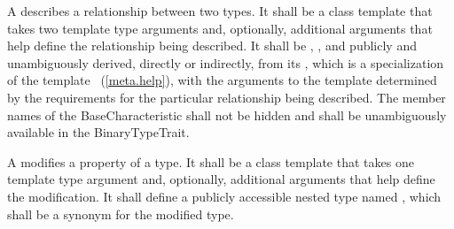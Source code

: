 \pnum
A  describes a
relationship between two types. It shall be a class template that
takes two template type arguments and, optionally, additional
arguments that help define the relationship being described. It shall
be , ,
and publicly and unambiguously derived, directly or
indirectly, from
its , which is a specialization
of the template
~(\ref{meta.help}), with
the arguments to the template  determined by the
requirements for the particular relationship being described.
The member names of the BaseCharacteristic shall not be hidden and shall be
unambiguously available in the BinaryTypeTrait.

\pnum
A 
modifies a property
of a type. It shall be a class template that takes one
template type argument and, optionally, additional arguments that help
define the modification. It shall define a publicly accessible nested type
named , which shall be a synonym for the modified type.

